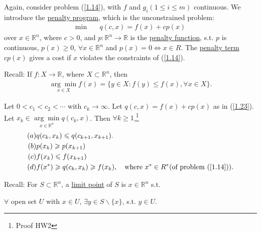 Again, consider problem (\ref{1.14}), with $f$ and $g_i(1\le i\le m)$ continuous. We introduce the \uline{penalty program}, which is the unconstrained problem:
\begin{align}
    \min&\quad q(c, x) = f(x) + cp(x) \label{1.23}
\end{align}
over $x\in \mathbb{R}^n$, where $c>0$, and $p:\mathbb{R}^n\to\mathbb{R}$ is the \uline{penalty function}, s.t. $p$ is continuous, $p(x)\ge 0$, $\forall x\in\mathbb{R}^n$ and $p(x) = 0\Longleftrightarrow x\in R$. The \uline{penalty term} $cp(x)$ gives a cost if $x$ violates the constraints of (\ref{1.14}).

\begin{remark}
    Recall: If $f:X\to \mathbb{R}$, where $X\subset \mathbb{R}^n$, then
    \begin{align*}
        \underset{x\in X}{\arg \min} f(x) = \{ y\in X: f(y)\leqslant f(x), \forall x\in X\}.
    \end{align*}
\end{remark}

\begin{lemma}
    Let $0<c_1<c_2<\cdots$ with $c_k\to\infty$. Let $q(c, x) = f(x) + cp(x)$ as in (\ref{1.23}). Let $x_k\in\underset{x\in\mathbb{R}^n}{\arg\min} q(c_k, x)$. Then $\forall k\geqslant 1$,\footnote{Proof HW2}
    \begin{align*}
        (a) & q(c_k, x_k) \leqslant q(c_{k+1}, x_{k+1}).\\
        (b) & p(x_k) \geqslant p(x_{k+1}) \\
        (c) & f(x_k) \leqslant f(x_{k+1}) \\
        (d) & f(x^*) \geqslant q(c_k, x_k) \geqslant f(x_k), \quad \text{where } x^*\in R^* (\text{of problem (\ref{1.14})}).
    \end{align*}
\end{lemma}

\begin{remark}
    Recall: For $S\subset \mathbb{R}^n$, a \uline{limit point} of $S$ is $x\in\mathbb{R}^n$ s.t.

    $\forall$ open set $U$ with $x\in U$, $\exists y\in S\backslash\{x\}$, s.t. $y\in U$.
\end{remark}

